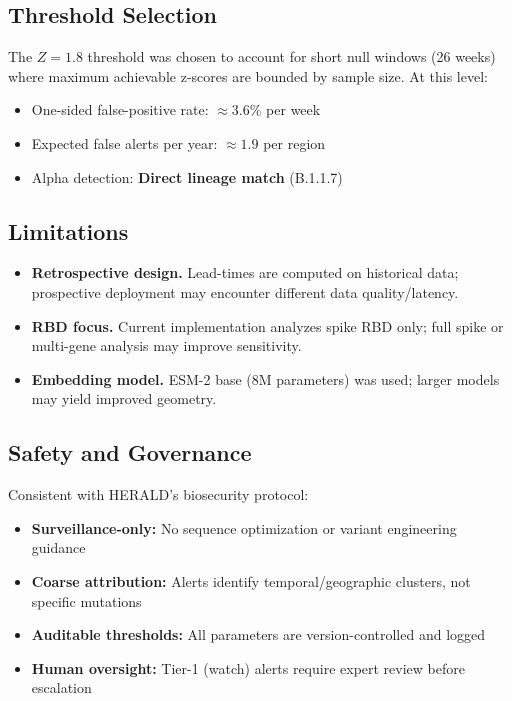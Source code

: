 \documentclass[11pt]{article}
\begin{document}
\subsection{Threshold Selection}
The $Z=1.8$ threshold was chosen to account for short null windows (26 weeks) where maximum achievable z-scores are bounded by sample size. At this level:
\begin{itemize}[leftmargin=1.1em]
  \item One-sided false-positive rate: $\approx 3.6\%$ per week
  \item Expected false alerts per year: $\approx 1.9$ per region
  \item Alpha detection: \textbf{Direct lineage match} (B.1.1.7)
\end{itemize}

\subsection{Limitations}
\begin{itemize}[leftmargin=1.1em]
  \item \textbf{Retrospective design.} Lead-times are computed on historical data; prospective deployment may encounter different data quality/latency.
  \item \textbf{RBD focus.} Current implementation analyzes spike RBD only; full spike or multi-gene analysis may improve sensitivity.
  \item \textbf{Embedding model.} ESM-2 base (8M parameters) was used; larger models may yield improved geometry.
\end{itemize}

\subsection{Safety and Governance}
Consistent with HERALD's biosecurity protocol:
\begin{itemize}[leftmargin=1.1em]
  \item \textbf{Surveillance-only:} No sequence optimization or variant engineering guidance
  \item \textbf{Coarse attribution:} Alerts identify temporal/geographic clusters, not specific mutations
  \item \textbf{Auditable thresholds:} All parameters are version-controlled and logged
  \item \textbf{Human oversight:} Tier-1 (watch) alerts require expert review before escalation
\end{itemize}
\end{document}
